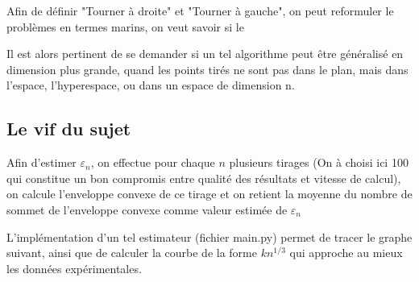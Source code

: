 \documentclass[a4paper,12pt,twoside]{article}
\begin{document}
		Afin de définir "Tourner à droite" et "Tourner à gauche", on peut reformuler le problèmes en termes marins, on veut savoir si le 

		Il est alors pertinent de se demander si un tel algorithme peut être généralisé en dimension plus grande, quand les points tirés ne sont pas dans le plan, mais dans l'espace, l'hyperespace, ou dans un espace de dimension n.



	\subsection{Le vif du sujet}
		Afin d'estimer $\varepsilon_n$, on effectue pour chaque $n$ plusieurs tirages (On à choisi ici 100 qui constitue un bon compromis entre qualité des résultats et vitesse de calcul), on calcule l'enveloppe convexe de ce tirage et on retient la moyenne du nombre de sommet de l'enveloppe convexe comme valeur estimée de $\varepsilon_n$

		L'implémentation d'un tel estimateur (fichier main.py) permet de tracer le graphe suivant, ainsi que de calculer la courbe de la forme $kn^{1/3}$ qui approche au mieux les données expérimentales.

		
\end{document}
